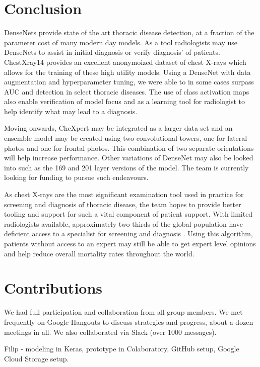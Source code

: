 \documentclass{amia}
\begin{document}
\section*{Conclusion}
DenseNets provide state of the art thoracic disease detection, at a fraction of the parameter cost of many modern day models. As a tool radiologists may use DenseNets to assist in initial diagnosis or verify diagnosis' of patients. ChestXray14 provides an excellent anonymoized dataset of chest X-rays which allows for the training of these high utility models. Using a DenseNet with data augmentation and hyperparameter tuning, we were able to in some cases surpass AUC and detection in select thoracic diseases. The use of class activation maps also enable verification of model focus and as a learning tool for radiologist to help identify what may lead to a diagnosis.

Moving onwards, CheXpert may be integrated as a larger data set and an ensemble model may be created using two convolutional towers, one for lateral photos and one for frontal photos. This combination of two separate orientations will help increase performance. Other variations of DenseNet may also be looked into such as the 169 and 201 layer versions of the model. The team is currently looking for funding to pursue such endeavours.

As chest X-rays are the most significant examination tool used in practice for screening and diagnosis of thoracic disease, the team hopes to provide better tooling and support for such a vital component of patient support. With limited radiologists available, approximately two thirds of the global population have deficient access to a specialist for screening and diagnosis \cite{ref16}. Using this algorithm, patients without access to an expert may still be able to get expert level opinions and help reduce overall mortality rates throughout the world.

\pagebreak

\section*{Contributions}
We had full participation and collaboration from all group members. We met frequently on Google Hangouts to discuss strategies and progress, about a dozen meetings in all. We also collaborated via Slack (over 1000 messages).

Filip - modeling in Keras, prototype in Colaboratory, GitHub setup, Google Cloud Storage setup.
\end{document}
